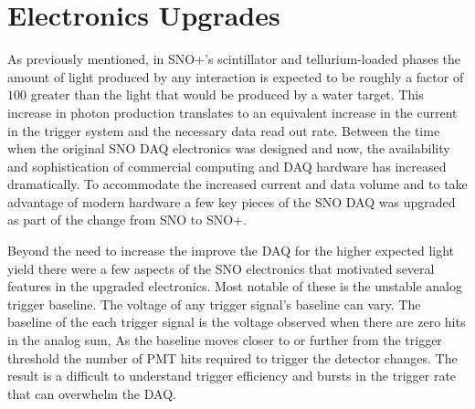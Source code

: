 

\section{Electronics Upgrades}
\label{sec:upgrades}
As previously mentioned, in SNO+'s scintillator and tellurium-loaded phases the
amount of light produced by any interaction is expected to be roughly a factor
of $100$ greater than the light that would be produced by a water target.
This increase in photon production translates to an equivalent increase in the
current in the trigger system and the necessary data read out rate.
Between the time when the original SNO DAQ electronics was designed and now,
the availability and sophistication of commercial computing and DAQ hardware
has increased dramatically.
To accommodate the increased current and data volume and to take advantage of modern
hardware a few key pieces of the SNO DAQ was upgraded as part of the change from
SNO to SNO+.

Beyond the need to increase the improve the DAQ for the higher expected light
yield there were a few aspects of the SNO electronics that motivated several
features in the upgraded electronics.
Most notable of these is the unstable analog trigger baseline.
The voltage of any trigger signal's baseline can vary.
The baseline of the each trigger signal is the voltage observed
when there are zero hits in the analog sum,
As the baseline moves closer to or further from the trigger threshold
the number of PMT hits required to trigger the detector changes.
The result is a difficult to understand trigger efficiency and bursts in the trigger
rate that can overwhelm the DAQ\@.

